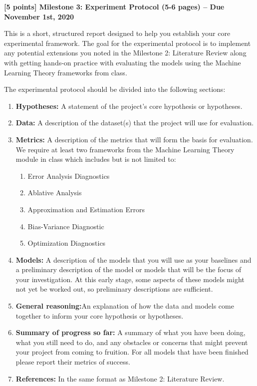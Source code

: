 \clearpage

\large
\textbf{[5 points] Milestone 3: Experiment Protocol (5-6 pages) -- Due November 1st, 2020}


\normalsize
This is a short, structured report designed to help you establish your core experimental framework. The goal for the experimental protocol is to implement any potential extensions you noted in the Milestone 2: Literature Review along with getting hands-on practice with evaluating the models using the Machine Learning Theory frameworks from class. \vspace{\baselineskip}

The experimental protocol should be divided into the following sections:
\begin{enumerate}
    \item \textbf{Hypotheses:} A statement of the project's core hypothesis or hypotheses.
    \item \textbf{Data:} A description of the dataset(s) that the project will use for evaluation.
    \item \textbf{Metrics:} A description of the metrics that will form the basis for evaluation. We require at least two frameworks from the Machine Learning Theory module in class which includes but is not limited to:
    \begin{enumerate}
        \item Error Analysis Diagnostics
        \item Ablative Analysis
        \item Approximation and Estimation Errors
        \item Bias-Variance Diagnostic
        \item Optimization Diagnostics
    \end{enumerate}
    \item \textbf{Models:}  A description of the models that you will use as your baselines and a preliminary description of the model or models that will be the focus of your investigation. At this early stage, some aspects of these models might not yet be worked out, so preliminary descriptions are sufficient.
    \item \textbf{General reasoning:}An explanation of how the data and models come together to inform your core hypothesis or hypotheses.
    \item \textbf{Summary of progress so far:} A summary of what you have been doing, what you still need to do, and any obstacles or concerns that might prevent your project from coming to fruition. For all models that have been finished please report their metrics of success. 
    \item \textbf{References:} In the same format as Milestone 2: Literature Review.
\end{enumerate}

